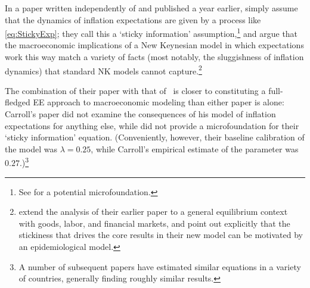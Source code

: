 In a paper written independently of \cite{carroll2003macroeconomic} and published a year earlier, \cite{mr2002Sticky} simply assume that the dynamics of inflation expectations are given by a process like \eqref{eq:StickyExp}; they call this a `sticky information' assumption,\footnote{See \bvbayesianlearningFull for a potential microfoundation.} and argue that the macroeconomic implications of a New Keynesian model in which expectations work this way match a variety of facts (most notably, the sluggishness of inflation dynamics) that standard NK models cannot capture.\footnote{\cite{mankiw2007sticky} extend the analysis of their earlier paper to a general equilibrium context with goods, labor, and financial markets, and point out explicitly that the stickiness that drives the core results in their new model can be motivated by an epidemiological model.}

The combination of their paper with that of~\cite{carroll2003macroeconomic} is closer to constituting a full-fledged EE approach to macroeconomic modeling than either paper is alone: Carroll's paper did not examine the consequences of his model of inflation expectations for anything else, while \cite{mr2002Sticky} did not provide a microfoundation for their `sticky information' equation.  (Conveniently, however, their baseline calibration of the model was $\lambda=0.25$, while Carroll's empirical estimate of the parameter was $0.27$.)\footnote{A number of subsequent papers have estimated similar equations in a variety of countries, generally finding roughly similar results.}

